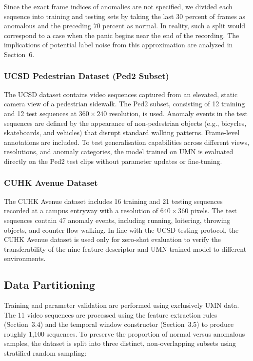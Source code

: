 Since the exact frame indices of anomalies are not specified, we divided each sequence into training and testing sets by taking the last 30 percent of frames as anomalous and the preceding 70 percent as normal. In reality, such a split would correspond to a case when the panic begins near the end of the recording. The implications of potential label noise from this approximation are analyzed in Section~6.

\subsubsection{UCSD Pedestrian Dataset (Ped2 Subset)}
The UCSD dataset \cite{mahadevan2010anomaly} contains video sequences captured from an elevated, static camera view of a pedestrian sidewalk. The Ped2 subset, consisting of 12 training and 12 test sequences at $360 \times 240$ resolution, is used. Anomaly events in the test sequences are defined by the appearance of non-pedestrian objects (e.g., bicycles, skateboards, and vehicles) that disrupt standard walking patterns. Frame-level annotations are included. To test generalisation capabilities across different views, resolutions, and anomaly categories, the model trained on UMN is evaluated directly on the Ped2 test clips without parameter updates or fine-tuning.

\subsubsection{CUHK Avenue Dataset}
The CUHK Avenue dataset \cite{lu2013abnormal} includes 16 training and 21 testing sequences recorded at a campus entryway with a resolution of $640 \times 360$ pixels. The test sequences contain 47 anomaly events, including running, loitering, throwing objects, and counter-flow walking. In line with the UCSD testing protocol, the CUHK Avenue dataset is used only for zero-shot evaluation to verify the transferability of the nine-feature descriptor and UMN-trained model to different environments.

\subsection{Data Partitioning}

Training and parameter validation are performed using exclusively UMN data. The 11 video sequences are processed using the feature extraction rules (Section~3.4) and the temporal window constructor (Section~3.5) to produce roughly 1{,}100 sequences. To preserve the proportion of normal versus anomalous samples, the dataset is split into three distinct, non-overlapping subsets using stratified random sampling:


